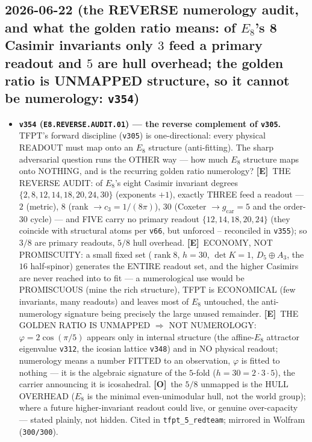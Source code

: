 \documentclass[11pt]{article}
\providecommand{\mE}{\textbf{[E]}}\providecommand{\mC}{\textbf{[C]}}
\providecommand{\mO}{\textbf{[O]}}\providecommand{\mX}{\textbf{[X]}}
\providecommand{\vref}[1]{\texttt{#1}}
\providecommand{\cthree}{c_3}\providecommand{\phiz}{\varphi_0^{\mathrm{ret}}}
\providecommand{\gcar}{g_{\mathrm{car}}}\providecommand{\Nfam}{N_{\mathrm{fam}}}
\begin{document}
\subsection*{2026-06-22 (the REVERSE numerology audit, and what the golden ratio means: of $E_8$'s 8 Casimir invariants only $3$ feed a primary readout and $5$ are hull overhead; the golden ratio is UNMAPPED structure, so it cannot be numerology: \texttt{v354})}
\begin{itemize}
\item \textbf{\texttt{v354} (\texttt{E8.REVERSE.AUDIT.01}) --- the reverse complement of \vref{v305}.} TFPT's forward
discipline (\vref{v305}) is one-directional: every physical READOUT must map onto an $E_8$ structure (anti-fitting).
The sharp adversarial question runs the OTHER way --- how much $E_8$ structure maps onto NOTHING, and is the
recurring golden ratio numerology? \mE\ THE REVERSE AUDIT: of $E_8$'s eight Casimir invariant degrees
$\{2,8,12,14,18,20,24,30\}$ (exponents $+1$), exactly THREE feed a readout --- $2$ (metric), $8$ (rank $\to\cthree
{=}1/(8\pi)$), $30$ (Coxeter $\to\gcar{=}5$ and the order-$30$ cycle) --- and FIVE carry no primary readout
$\{12,14,18,20,24\}$ (they coincide with structural atoms per \vref{v66}, but unforced -- reconciled in \vref{v355});
so $3/8$ are primary readouts, $5/8$ hull overhead. \mE\ ECONOMY, NOT PROMISCUITY: a small fixed set ($\operatorname{rank}8$,
$h{=}30$, $\det K{=}1$, $D_5{\oplus}A_3$, the $16$ half-spinor) generates the ENTIRE readout set, and the higher
Casimirs are never reached into to fit --- a numerological use would be PROMISCUOUS (mine the rich structure), TFPT is
ECONOMICAL (few invariants, many readouts) and leaves most of $E_8$ untouched, the anti-numerology signature being
precisely the large unused remainder. \mE\ THE GOLDEN RATIO IS UNMAPPED $\Rightarrow$ NOT NUMEROLOGY: $\varphi=2\cos
(\pi/5)$ appears only in internal structure (the affine-$E_8$ attractor eigenvalue \vref{v312}, the icosian lattice
\vref{v348}) and in NO physical readout; numerology means a number FITTED to an observation, $\varphi$ is fitted to
nothing --- it is the algebraic signature of the $5$-fold ($h{=}30{=}2\cdot3\cdot5$), the carrier announcing it is
icosahedral. \mO\ the $5/8$ unmapped is the HULL OVERHEAD ($E_8$ is the minimal even-unimodular hull, not the world
group); where a future higher-invariant readout could live, or genuine over-capacity --- stated plainly, not hidden.
Cited in \texttt{tfpt\_5\_redteam}; mirrored in Wolfram (\texttt{300/300}).
\end{itemize}
\end{document}
